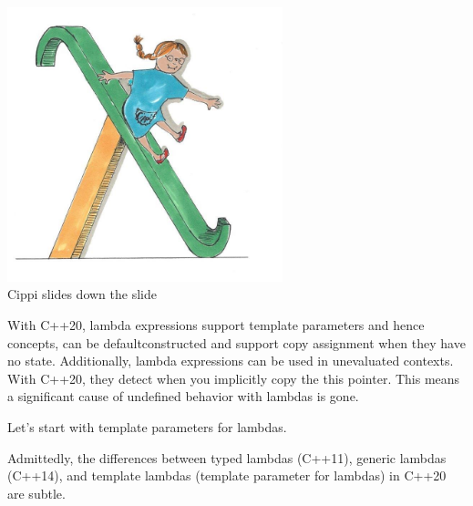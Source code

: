 \begin{center}
\includegraphics[width=0.6\textwidth]{content/3/chapter4/images/41.png}\\
Cippi slides down the slide
\end{center}

With C++20, lambda expressions support template parameters and hence concepts, can be defaultconstructed and support copy assignment when they have no state. Additionally, lambda expressions can be used in unevaluated contexts. With C++20, they detect when you implicitly copy the this pointer. This means a significant cause of undefined behavior with lambdas is gone.

Let’s start with template parameters for lambdas.



Admittedly, the differences between typed lambdas (C++11), generic lambdas (C++14), and template lambdas (template parameter for lambdas) in C++20 are subtle.

